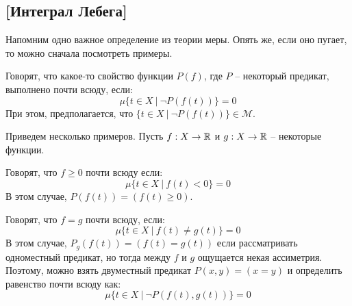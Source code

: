 \documentclass[../main.tex]{subfiles}
\begin{document}
\subsection{[Интеграл Лебега]}

Напомним одно важное определение из теории меры. Опять же, если оно пугает, то можно сначала посмотреть примеры.

\begin{definition}
	Говорят, что какое-то свойство функции $P(f)$, где $P$ -- некоторый предикат, выполнено почти всюду, если:
	\begin{equation}
		\mu\{t \in X \ | \ \neg P(f(t)) \} = 0
	\end{equation}
	При этом, предполагается, что $\{t \in X \ | \ \neg P(f(t))\} \in \mathcal{M}$.
\end{definition}

Приведем несколько примеров. Пусть $f : X \to \mathbb{R}$ и $g : X \to \mathbb{R}$ -- некоторые функции. 

\begin{example}
	Говорят, что  $f \geq 0$ почти всюду если:
	\begin{equation*}
		\mu\{t \in X \ | \ f(t) < 0 \} = 0
	\end{equation*}
	В этом случае, $P(f(t)) = (f(t) \geq 0)$. 
\end{example}

\begin{example}
	Говорят, что $f = g$ почти всюду, если:
	\begin{equation*}
		\mu\{t \in X \ | \ f(t) \neq g(t)\} = 0
	\end{equation*}
	В этом случае, $P_g (f(t)) = (f(t) = g(t))$ если рассматривать одноместный предикат, но тогда между $f$ и $g$ ощущается некая ассиметрия. Поэтому, можно взять двуместный предикат $P(x, y) = (x = y)$ и определить равенство почти всюду как:
	\begin{equation*}
		\mu\{t \in X \ | \ \neg P(f(t), g(t))\} = 0
	\end{equation*}
\end{example}
\end{document}
